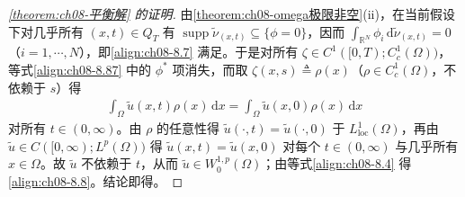 \documentclass[../../main.tex]{subfiles}%
\begin{document}
\begin{proof}[\cref{theorem:ch08-平衡解} 的证明]
由\cref{theorem:ch08-omega极限非空}(ii)，在当前假设下对几乎所有 $(x,t)\in Q_T$ 有 $\operatorname{supp}\tilde\nu_{(x,t)}\subseteq\{\phi=0\}$，因而 $\int_{\mathbb{R}^N}\phi_i\,\mathrm{d}\tilde\nu_{(x,t)}=0$（$i=1,\cdots ,N$），即\eqref{align:ch08-8.7} 满足。于是对所有 $\zeta\in C^1([0,T);C^1_c(\Omega))$，等式\eqref{align:ch08-8.87} 中的 $\phi^*$ 项消失，而取 $\zeta(x,s)\triangleq\rho(x)$（$\rho\in C^1_c(\Omega)$，不依赖于 $s$）得
\begin{align*}
\int_\Omega\tilde u(x,t)\rho(x)\,\mathrm{d}x=\int_\Omega\tilde u(x,0)\rho(x)\,\mathrm{d}x
\end{align*}
对所有 $t\in(0,\infty)$。由 $\rho$ 的任意性得 $\tilde u(\cdot,t)=\tilde u(\cdot,0)$ 于 $L^1_{\mathrm{loc}}(\Omega)$，再由 $\tilde u\in C([0,\infty);L^p(\Omega))$ 得 $\tilde u(x,t)=\tilde u(x,0)$ 对每个 $t\in(0,\infty)$ 与几乎所有 $x\in\Omega$。故 $\tilde u$ 不依赖于 $t$，从而 $\tilde u\in W^{1,p}_0(\Omega)$；由等式\eqref{align:ch08-8.4} 得\eqref{align:ch08-8.8}。结论即得。
\end{proof}
\end{document}
